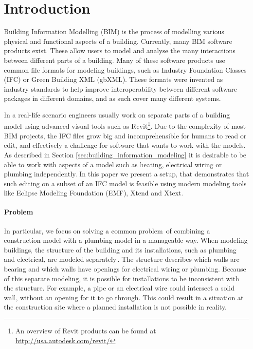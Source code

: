 

\setcounter{page}{1}
\section{Introduction}
Building Information Modelling (BIM) is the process of modelling various physical and functional aspects of a building. Currently, many BIM software products exist. These allow users to model and analyse the many interactions between different parts of a building. Many of these software products use common file formats for modeling buildings, such as Industry Foundation Classes (IFC) or Green Building XML (gbXML). These formats were invented as industry standards to help improve interoperability between different software packages in different domains, and as such cover many different systems.

In a real-life scenario engineers usually work on separate parts of a building model using advanced visual tools such as Revit\footnote{An overview of Revit products can be found at \url{http://usa.autodesk.com/revit/}}. Due to the complexity of most BIM projects, the IFC files grow big and incomprehensible for humans to read or edit, and effectively a challenge for software that wants to work with the models. As described in Section \ref{sec:building_information_modeling} it is desirable to be able to work with aspects of a model such as heating, electrical wiring or plumbing independently. In this paper we present a setup, that demonstrates that such editing on a subset of an IFC model is feasible using modern modeling tools like Eclipse Modeling Foundation (EMF), Xtend and Xtext.

\paragraph{Problem}
In particular, we focus on solving a common problem\,\cite[pp. 20]{jorgensen10} of combining a construction model with a plumbing model in a manageable way. When modeling buildings, the structure of the building and its installations, such as plumbing and electrical, are modeled separately\,\cite[pp. 19--20]{jorgensen10}. The structure describes which walls are bearing and which walls have openings for electrical wiring or plumbing.  Because of this separate modeling, it is possible for installations to be inconsistent with the structure. For example, a pipe or an electrical wire could intersect a solid wall, without an opening for it to go through. This could result in a situation at the construction site where a planned installation is not possible in reality. 

